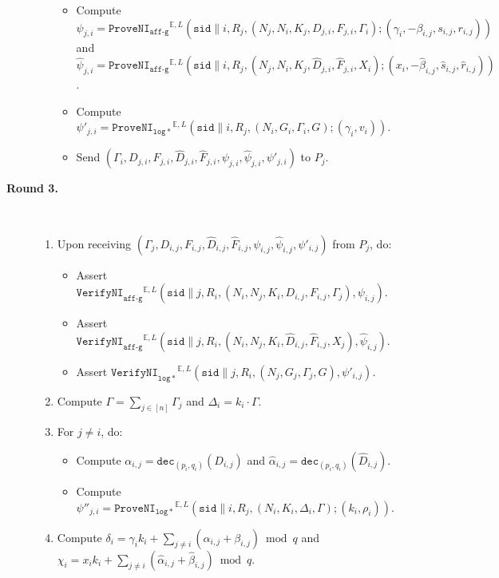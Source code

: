 \documentclass[11pt]{article}
\newcommand{\jnote}[1]{{\textcolor{blue}{Jon's note: #1}}}
\newcommand{\dec}{\ensuremath{\mathtt{dec}}}
\newcommand{\sid}{\ensuremath{\mathtt{sid}}}
\newcommand{\proveni}[1]{\ensuremath{\mathtt{ProveNI}_{\mathtt{#1}}}}
\newcommand{\verifyni}[1]{\ensuremath{\mathtt{VerifyNI}_{\mathtt{#1}}}}
\newcommand{\E}{\mathbb{E}}
\newcommand{\?}[1]{\stackrel{?}{#1}}
\begin{document}
\begin{description}
\begin{itemize}
\begin{itemize}
            \item Compute $\psi_{j,i} = \proveni{aff\mbox{-}g}^{\E,L}(\sid \| i, R_j, (N_j, N_i, K_j, D_{j,i}, F_{j,i}, \Gamma_i); (\gamma_i, -\beta_{i,j}, s_{i,j}, r_{i,j}))$ and
            $\hat{\psi}_{j,i} = \proveni{aff\mbox{-}g}^{\E,L}(\sid \| i, R_j, (N_j, N_i, K_j, \hat{D}_{j,i}, \hat{F}_{j,i}, X_i); (x_i, -\hat{\beta}_{i,j}, \hat{s}_{i,j}, \hat{r}_{i,j}))$. 
            
            \item Compute $\psi'_{j,i} = \proveni{log*}^{\E,L}(\sid \| i,R_j, (N_i, G_i, \Gamma_i, G); (\gamma_i, v_i))$.
\item         Send $(\Gamma_i, D_{j,i}, F_{j,i}, \hat{D}_{j,i}, \hat{F}_{j,i}, \psi_{j,i}, \hat{\psi}_{j,i}, \psi'_{j,i})$
        to $P_j$.
        \end{itemize}
        \end{itemize}

    \item[\textbf{Round 3.}] \ 
    \begin{enumerate}
        \item Upon receiving $(\Gamma_j, D_{i,j}, F_{i,j}, \hat{D}_{i,j}, \hat{F}_{i,j}, \psi_{i,j}, \hat{\psi}_{i,j}, \psi'_{i,j})$ from $P_j$, do:

        \begin{itemize}
            \item Assert $\verifyni{aff\mbox{-}g}^{\E,L}(\sid \| j, R_i, (N_i, N_j, K_i, D_{i,j}, F_{i,j}, \Gamma_j), \psi_{i,j})$.
            \item Assert $\verifyni{aff\mbox{-}g}^{\E,L}(\sid \| j, R_i, (N_i, N_j, K_i, \hat{D}_{i,j}, \hat{F}_{i,j}, X_j), \hat{\psi}_{i,j})$.
            \item Assert $\verifyni{log*}^{\E,L}(\sid \| j, R_i, (N_j, G_j, \Gamma_j, G), \psi'_{i,j})$.
        \end{itemize}

        \item Compute $\Gamma = \sum_{j\in [n]} \Gamma_j$ and $\Delta_i = k_i \cdot \Gamma$.

        \item For $j \ne i$, do:
        \begin{itemize}
            \item Compute $\alpha_{i,j} = \dec_{(p_i,q_i)}(D_{i,j})$ and $\hat{\alpha}_{i,j} = \dec_{(p_i,q_i)}(\hat{D}_{i,j})$.
            \item Compute $\psi''_{j,i} = \proveni{log*}^{\E,L}(\sid \| i, R_j,(N_i, K_i, \Delta_i, \Gamma); (k_i, \rho_i))$.
        \end{itemize}
        \item  Compute $\delta_i = \gamma_i k_i + \sum_{j \ne i}(\alpha_{i,j} + \beta_{i,j}) \bmod q$ and
            $\chi_i = x_i k_i + \sum_{j \ne i}(\hat{\alpha}_{i,j} + \hat{\beta}_{i,j}) \bmod q$. 


\end{enumerate}
\end{description}
\end{document}
